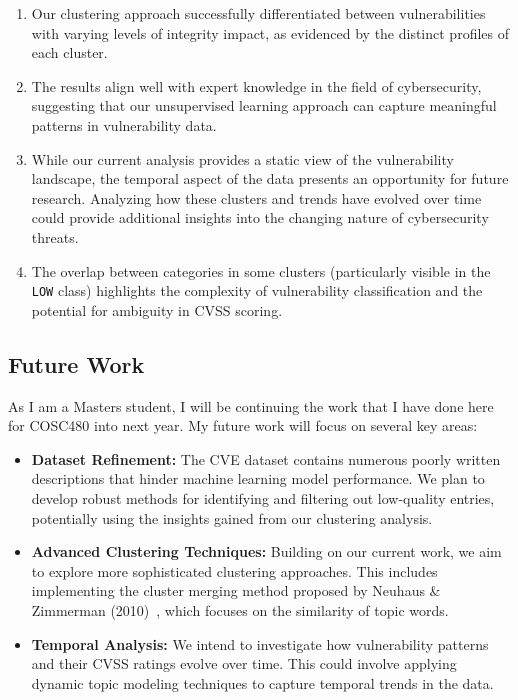 \documentclass[12pt]{article}
\begin{document}
\begin{enumerate}

	\item Our clustering approach successfully differentiated between vulnerabilities with varying
	      levels of integrity impact, as evidenced by the distinct profiles of each cluster.

	\item The results align well with expert knowledge in the field of cybersecurity, suggesting
	      that our unsupervised learning approach can capture meaningful patterns in vulnerability
	      data.

	\item While our current analysis provides a static view of the vulnerability landscape, the
	      temporal aspect of the data presents an opportunity for future research. Analyzing how these
	      clusters and trends have evolved over time could provide additional insights into the
	      changing nature of cybersecurity threats.

	\item The overlap between categories in some clusters (particularly visible in the \texttt{LOW}
	      class) highlights the complexity of vulnerability classification and the potential for
	      ambiguity in CVSS scoring.

\end{enumerate}


\subsection{Future Work}

As I am a Masters student, I will be continuing the work that I have done here for COSC480 into next
year. My future work will focus on several key areas:

\begin{itemize}

	\item \textbf{Dataset Refinement:} The CVE dataset contains numerous poorly written descriptions
	      that hinder machine learning model performance. We plan to develop robust methods for
	      identifying and filtering out low-quality entries, potentially using the insights gained
	      from our clustering analysis.

	\item \textbf{Advanced Clustering Techniques:} Building on our current work, we aim to explore
	      more sophisticated clustering approaches. This includes implementing the cluster merging
	      method proposed by Neuhaus \& Zimmerman (2010)~\cite{cve_topic_modelling}, which focuses on
	      the similarity of topic words.

	\item \textbf{Temporal Analysis:} We intend to investigate how vulnerability patterns and their
	      CVSS ratings evolve over time. This could involve applying dynamic topic modeling techniques
	      to capture temporal trends in the data.

\end{itemize}
\end{document}
